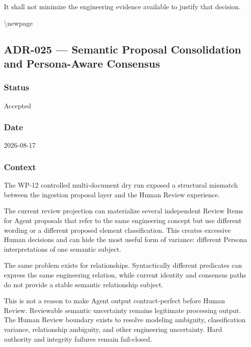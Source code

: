 It shall not minimize the engineering evidence available to justify that decision.

\textbackslash newpage

\hypertarget{adr-025--semantic-proposal-consolidation-and-persona-aware-consensus}{%
\subsection{ADR-025 --- Semantic Proposal Consolidation and Persona-Aware Consensus}\label{adr-025--semantic-proposal-consolidation-and-persona-aware-consensus}}

\hypertarget{status-7}{%
\subsubsection{Status}\label{status-7}}

Accepted

\hypertarget{date-7}{%
\subsubsection{Date}\label{date-7}}

2026-08-17

\hypertarget{context-10}{%
\subsubsection{Context}\label{context-10}}

The WP-12 controlled multi-document dry run exposed a structural mismatch between the ingestion proposal layer and the Human Review experience.

The current review projection can materialize several independent Review Items for Agent proposals that refer to the same engineering concept but use different wording or a different proposed element classification. This creates excessive Human decisions and can hide the most useful form of variance: different Persona interpretations of one semantic subject.

The same problem exists for relationships. Syntactically different predicates can express the same engineering relation, while current identity and consensus paths do not provide a stable semantic relationship subject.

This is not a reason to make Agent output contract-perfect before Human Review. Reviewable semantic uncertainty remains legitimate processing output. The Human Review boundary exists to resolve modeling ambiguity, classification variance, relationship ambiguity, and other engineering uncertainty. Hard authority and integrity failures remain fail-closed.

